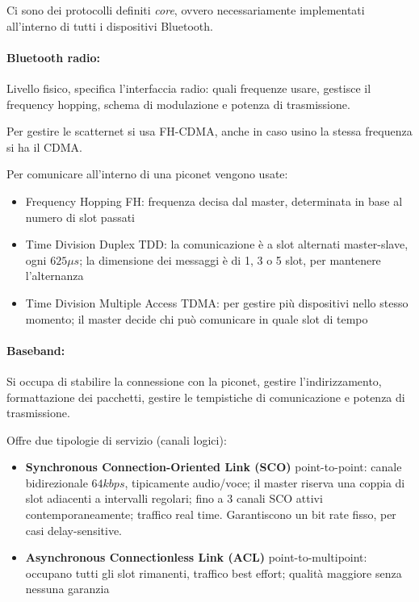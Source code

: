 Ci sono dei protocolli definiti \textit{core}, ovvero necessariamente implementati all'interno di tutti i dispositivi Bluetooth.

\paragraph{Bluetooth radio:} Livello fisico, specifica l'interfaccia radio: quali frequenze usare, gestisce il frequency hopping, schema di modulazione e potenza di trasmissione.

Per gestire le scatternet si usa FH-CDMA, anche in caso usino la stessa frequenza si ha il CDMA.

Per comunicare all'interno di una piconet vengono usate: 
\begin{itemize}
    \item Frequency Hopping FH: frequenza decisa dal master, determinata in base al numero di slot passati
    
    \item Time Division Duplex TDD: la comunicazione è a slot alternati master-slave, ogni $625\mu s$; la dimensione dei messaggi è di 1, 3 o 5 slot, per mantenere l'alternanza
    
    \item Time Division Multiple Access TDMA: per gestire più dispositivi nello stesso momento; il master decide chi può comunicare in quale slot di tempo
\end{itemize}

\paragraph{Baseband:} Si occupa di stabilire la connessione con la piconet, gestire l'indirizzamento, formattazione dei pacchetti, gestire le tempistiche di comunicazione e potenza di trasmissione.

Offre due tipologie di servizio (canali logici): 
\begin{itemize}
    \item \textbf{Synchronous Connection-Oriented Link (SCO)} point-to-point: canale bidirezionale $64kbps$, tipicamente audio/voce; il master riserva una coppia di slot adiacenti a intervalli regolari; fino a 3 canali SCO attivi contemporaneamente; traffico real time. Garantiscono un bit rate fisso, per casi delay-sensitive.
    
    \item \textbf{Asynchronous Connectionless Link (ACL)} point-to-multipoint: occupano tutti gli slot rimanenti, traffico best effort; qualità maggiore senza nessuna garanzia
\end{itemize}

